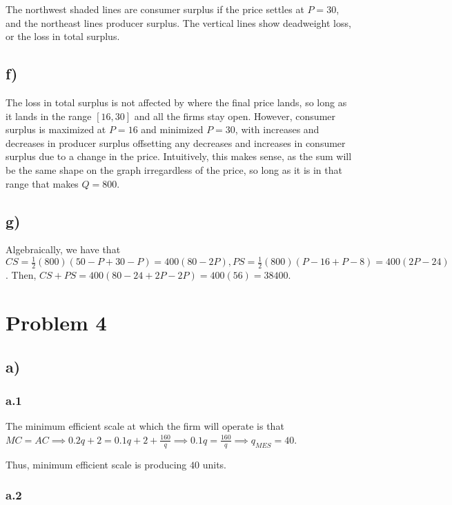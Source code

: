 \documentclass[12pt,letterpaper]{article}
\theoremstyle{definition}
\begin{document}
The northwest shaded lines are consumer surplus if the price settles at $P
=30$, and the northeast lines producer surplus. The vertical lines show
deadweight loss, or the loss in total surplus.

\subsection*{f)}

The loss in total surplus is not affected by where the final price lands, so
long as it lands in the range $[16,30]$ and all the firms stay open. However,
consumer surplus is maximized at $P = 16$ and minimized $P = 30$, with increases
and decreases in producer surplus offsetting any decreases and increases in
consumer surplus due to a change in the price. Intuitively, this makes sense, as
the sum will be the same shape on the graph irregardless of the price, so long
as it is in that range that makes $Q = 800$.

\subsection*{g)}

Algebraically, we have that $CS = \frac{1}{2}(800)(50 - P  + 30 - P) = 400(80 -
2P), PS = \frac{1}{2}(800)(P - 16 + P - 8) = 400(2P  - 24)$. Then, $CS + PS =
400(80 - 24 + 2P - 2P) = 400(56) = 38400$. 

\section*{Problem 4}

\subsection*{a)}
\subsubsection*{a.1}

The minimum efficient scale at which the firm will operate is that $MC = AC
\implies 0.2q + 2 = 0.1q + 2 + \frac{160}{q} \implies 0.1q = \frac{160}{q}
\implies q_{MES} = 40$.

Thus, minimum efficient scale is producing $40$ units.

\subsubsection*{a.2}
\end{document}
